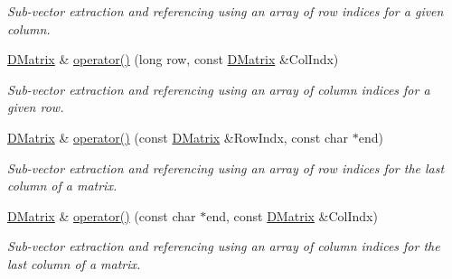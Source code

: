 \begin{DoxyCompactItemize}
\begin{DoxyCompactList}\small\item\em Sub-\/vector extraction and referencing using an array of row indices for a given column. \item\end{DoxyCompactList}\item 
\hyperlink{classDMatrix}{DMatrix} \& \hyperlink{classDMatrix_af44540d97b6e449fd3f1551956ea2518}{operator()} (long row, const \hyperlink{classDMatrix}{DMatrix} \&ColIndx)
\begin{DoxyCompactList}\small\item\em Sub-\/vector extraction and referencing using an array of column indices for a given row. \item\end{DoxyCompactList}\item 
\hyperlink{classDMatrix}{DMatrix} \& \hyperlink{classDMatrix_a847dc65e8a09a3274b7a6e54acb37a17}{operator()} (const \hyperlink{classDMatrix}{DMatrix} \&RowIndx, const char $\ast$end)
\begin{DoxyCompactList}\small\item\em Sub-\/vector extraction and referencing using an array of row indices for the last column of a matrix. \item\end{DoxyCompactList}\item 
\hyperlink{classDMatrix}{DMatrix} \& \hyperlink{classDMatrix_ad9815228adc3856c7cdc8ecca281d5a3}{operator()} (const char $\ast$end, const \hyperlink{classDMatrix}{DMatrix} \&ColIndx)
\begin{DoxyCompactList}\small\item\em Sub-\/vector extraction and referencing using an array of column indices for the last column of a matrix. \item\end{DoxyCompactList}\end{DoxyCompactItemize}
